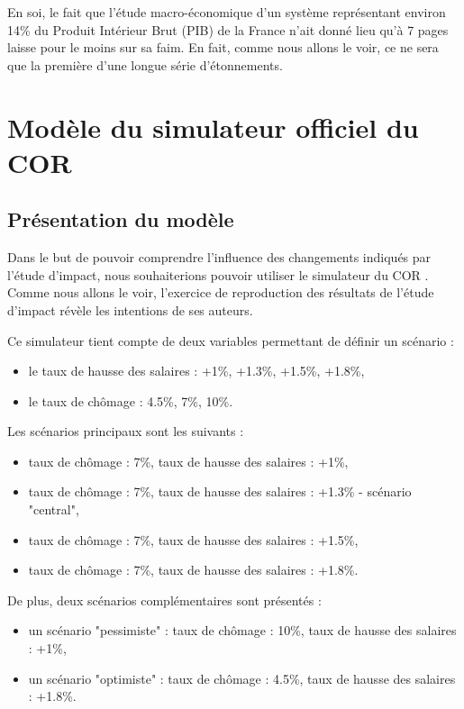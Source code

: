 \documentclass[10pt]{article}
\begin{document}
En soi, le fait que l'étude macro-économique d'un système représentant environ 14\% 
du Produit Intérieur Brut (PIB) de la France n'ait donné lieu qu'à 7 pages laisse pour le 
moins sur sa faim. 
En fait, comme nous allons le voir, ce ne sera que la première d'une longue 
série d'étonnements. 


\section{Modèle du simulateur officiel du COR}


\subsection{Présentation du modèle}

Dans le but de pouvoir comprendre l'influence des changements indiqués par 
l'étude d'impact, nous souhaiterions pouvoir utiliser le simulateur du COR 
\cite{SimulateurCOR}. 
Comme nous allons le voir, l'exercice de reproduction des résultats 
de l'étude d'impact révèle les intentions de ses auteurs. 

Ce simulateur tient compte de deux variables permettant de définir un scénario :
\begin{itemize}
\item le taux de hausse des salaires : +1\%, +1.3\%, +1.5\%, +1.8\%, 
\item le taux de chômage : 4.5\%, 7\%, 10\%.
\end{itemize}

Les scénarios principaux sont les suivants :
\begin{itemize}
\item taux de chômage : 7\%, taux de hausse des salaires : +1\%, 
\item taux de chômage : 7\%, taux de hausse des salaires : +1.3\% - scénario "central", 
\item taux de chômage : 7\%, taux de hausse des salaires : +1.5\%, 
\item taux de chômage : 7\%, taux de hausse des salaires : +1.8\%.
\end{itemize}
De plus, deux scénarios complémentaires sont présentés :
\begin{itemize}
\item un scénario "pessimiste" : taux de chômage : 10\%, taux de hausse des salaires : +1\%, 
\item un scénario "optimiste" : taux de chômage : 4.5\%, taux de hausse des salaires : +1.8\%. 
\end{itemize}
\end{document}
